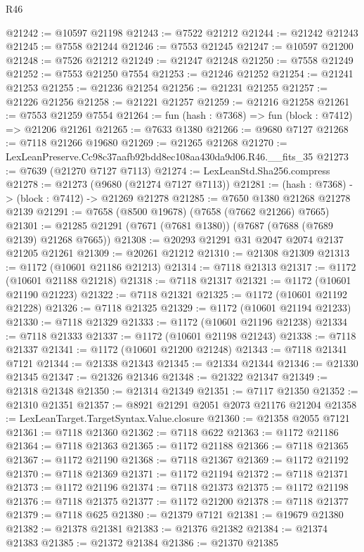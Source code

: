 \begin{lexlean}{R46}
\begin{coremodule}
@21242 := @10597 @21198
@21243 := @7522 @21212
@21244 := @21242 @21243
@21245 := @7558 @21244
@21246 := @7553 @21245
@21247 := @10597 @21200
@21248 := @7526 @21212
@21249 := @21247 @21248
@21250 := @7558 @21249
@21252 := @7553 @21250 @7554
@21253 := @21246 @21252
@21254 := @21241 @21253
@21255 := @21236 @21254
@21256 := @21231 @21255
@21257 := @21226 @21256
@21258 := @21221 @21257
@21259 := @21216 @21258
@21261 := @7553 @21259 @7554
@21264 := fun (hash : @7368) => fun (block : @7412) => @21206 @21261
@21265 := @7633 @1380
@21266 := @9680 @7127
@21268 := @7118 @21266 @19680
@21269 := @21265 @21268
@21270 := LexLeanPreserve.Cc98c37aafb92bdd8ec108aa430da9d06.R46.__fits_35
@21273 := @7639 (@21270 @7127 @7113)
@21274 := LexLeanStd.Sha256.compress
@21278 := @21273 (@9680 (@21274 @7127 @7113))
@21281 := (hash : @7368) -> (block : @7412) -> @21269 @21278
@21285 := @7650 @1380 @21268 @21278 @2139
@21291 := @7658 (@8500 @19678) (@7658 (@7662 @21266) @7665)
@21301 := @21285 @21291 (@7671 (@7681 @1380)) (@7687 (@7688 (@7689 @2139) @21268 @7665))
@21308 := @20293 @21291 @31 @2047 @2074 @2137 @21205 @21261
@21309 := @20261 @21212
@21310 := @21308 @21309
@21313 := @1172 (@10601 @21186 @21213)
@21314 := @7118 @21313
@21317 := @1172 (@10601 @21188 @21218)
@21318 := @7118 @21317
@21321 := @1172 (@10601 @21190 @21223)
@21322 := @7118 @21321
@21325 := @1172 (@10601 @21192 @21228)
@21326 := @7118 @21325
@21329 := @1172 (@10601 @21194 @21233)
@21330 := @7118 @21329
@21333 := @1172 (@10601 @21196 @21238)
@21334 := @7118 @21333
@21337 := @1172 (@10601 @21198 @21243)
@21338 := @7118 @21337
@21341 := @1172 (@10601 @21200 @21248)
@21343 := @7118 @21341 @7121
@21344 := @21338 @21343
@21345 := @21334 @21344
@21346 := @21330 @21345
@21347 := @21326 @21346
@21348 := @21322 @21347
@21349 := @21318 @21348
@21350 := @21314 @21349
@21351 := @7117 @21350
@21352 := @21310 @21351
@21357 := @8921 @21291 @2051 @2073 @21176 @21204
@21358 := LexLeanTarget.TargetSyntax.Value.closure
@21360 := @21358 @2055 @7121
@21361 := @7118 @21360
@21362 := @7118 @622
@21363 := @1172 @21186
@21364 := @7118 @21363
@21365 := @1172 @21188
@21366 := @7118 @21365
@21367 := @1172 @21190
@21368 := @7118 @21367
@21369 := @1172 @21192
@21370 := @7118 @21369
@21371 := @1172 @21194
@21372 := @7118 @21371
@21373 := @1172 @21196
@21374 := @7118 @21373
@21375 := @1172 @21198
@21376 := @7118 @21375
@21377 := @1172 @21200
@21378 := @7118 @21377
@21379 := @7118 @625
@21380 := @21379 @7121
@21381 := @19679 @21380
@21382 := @21378 @21381
@21383 := @21376 @21382
@21384 := @21374 @21383
@21385 := @21372 @21384
@21386 := @21370 @21385

\end{coremodule}
\end{lexlean}
